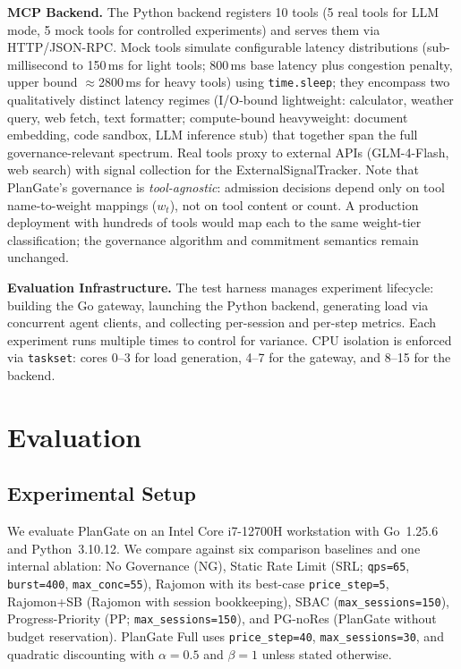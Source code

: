 \documentclass[sigconf,review,anonymous]{acmart}
\begin{document}
\textbf{MCP Backend.} The Python backend registers 10 tools (5 real tools for LLM mode, 5 mock tools for controlled experiments) and serves them via HTTP/JSON-RPC. Mock tools simulate configurable latency distributions (sub-millisecond to 150\,ms for light tools; 800\,ms base latency plus congestion penalty, upper bound $\approx$2800\,ms for heavy tools) using \texttt{time.sleep}; they encompass two qualitatively distinct latency regimes (I/O-bound lightweight: calculator, weather query, web fetch, text formatter; compute-bound heavyweight: document embedding, code sandbox, LLM inference stub) that together span the full governance-relevant spectrum. Real tools proxy to external APIs (GLM-4-Flash, web search) with signal collection for the ExternalSignalTracker. Note that PlanGate's governance is \emph{tool-agnostic}: admission decisions depend only on tool name-to-weight mappings ($w_t$), not on tool content or count. A production deployment with hundreds of tools would map each to the same weight-tier classification; the governance algorithm and commitment semantics remain unchanged.


\textbf{Evaluation Infrastructure.} The test harness manages experiment lifecycle: building the Go gateway, launching the Python backend, generating load via concurrent agent clients, and collecting per-session and per-step metrics. Each experiment runs multiple times to control for variance. CPU isolation is enforced via \texttt{taskset}: cores 0--3 for load generation, 4--7 for the gateway, and 8--15 for the backend.



\section{Evaluation}

\subsection{Experimental Setup}

We evaluate PlanGate on an Intel Core i7-12700H workstation with Go~1.25.6 and Python~3.10.12. We compare against six comparison baselines and one internal ablation: No Governance (NG), Static Rate Limit (SRL; \texttt{qps=65}, \texttt{burst=400}, \texttt{max\_conc=55}), Rajomon with its best-case \texttt{price\_step=5}, Rajomon+SB (Rajomon with session bookkeeping), SBAC (\texttt{max\_sessions=150}), Progress-Priority (PP; \texttt{max\_sessions=150}), and PG-noRes (PlanGate without budget reservation). PlanGate Full uses \texttt{price\_step=40}, \texttt{max\_sessions=30}, and quadratic discounting with $\alpha{=}0.5$ and $\beta{=}1$ unless stated otherwise.
\end{document}
